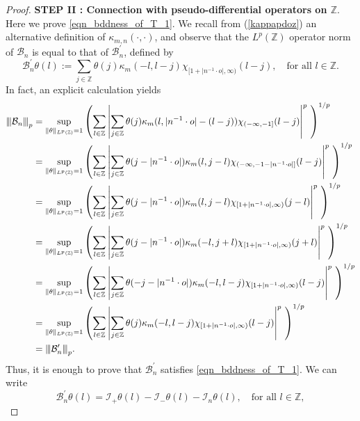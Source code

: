 \documentclass[12pt,reqno]{amsart}
\newcommand{\vertiii}[1]{{\left\vert\kern-0.25ex\left\vert\kern-0.25ex\left\vert #1 
		\right\vert\kern-0.25ex\right\vert\kern-0.25ex\right\vert}}
\newcommand{\Z}{\mathbb Z}%
\theoremstyle{definition}
\theoremstyle{definition}
\numberwithin{equation}{section}
\begin{document}
\begin{proof}
	 
\noindent \textbf{STEP II : Connection with pseudo-differential operators on $ \Z. $} Here we  prove \eqref{eqn_bddness_of_T_1}. We recall from (\ref{kappapdoz}) an alternative definition  of $\kappa_{m,n}(\cdot,\cdot)$, and observe that the $L^p(\Z)$ operator norm of $\mathcal{B}_n$ is equal to that of $\mathcal{B}^{\prime}_n$, defined by
	$$\mathcal{B}^{\prime}_n\theta(l):=\sum\limits_{j\in\mathbb{Z}}\theta(j)\kappa_{m}(-l,l-j)\chi_{[1+|n^{-1}\cdot o|,\infty)}(l-j),\quad\text{for all }l\in\mathbb{Z}.$$
In fact, an explicit calculation yields
\begin{align*}\allowdisplaybreaks
		\vertiii{\mathcal{B}_n}_{p}&=\sup\limits_{\|\theta\|_{L^{p}(\mathbb{Z})}=1}\left(\sum\limits_{l\in\mathbb{Z}}\left|\sum\limits_{j\in\mathbb{Z}}\theta(j)\kappa_{m}(l,|n^{-1}\cdot o|-(l-j))\chi_{(-\infty,-1]}(l-j)\right|^{p}~\right)^{1/p}\\
		&=\sup\limits_{\|\theta\|_{L^{p}(\mathbb{Z})}=1}\left(\sum\limits_{l\in\mathbb{Z}}\left|\sum\limits_{j\in\mathbb{Z}}\theta(j-|n^{-1}\cdot o|)\kappa_{m}(l,j-l)\chi_{(-\infty,-1-|n^{-1}\cdot o|]}(l-j)\right|^{p}~\right)^{1/p}\\
		&=\sup\limits_{\|\theta\|_{L^{p}(\mathbb{Z})}=1}\left(\sum\limits_{l\in\mathbb{Z}}\left|\sum\limits_{j\in\mathbb{Z}}\theta(j-|n^{-1}\cdot o|)\kappa_{m}(l,j-l)\chi_{[1+|n^{-1}\cdot o|,\infty)}(j-l)\right|^{p}~\right)^{1/p}\\
		&=\sup\limits_{\|\theta\|_{L^{p}(\mathbb{Z})}=1}\left(\sum\limits_{l\in\mathbb{Z}}\left|\sum\limits_{j\in\mathbb{Z}}\theta(j-|n^{-1}\cdot o|)\kappa_{m}(-l,j+l)\chi_{[1+|n^{-1}\cdot o|,\infty)}(j+l)\right|^{p}~\right)^{1/p}\\
		&=\sup\limits_{\|\theta\|_{L^{p}(\mathbb{Z})}=1}\left(\sum\limits_{l\in\mathbb{Z}}\left|\sum\limits_{j\in\mathbb{Z}}\theta(-j-|n^{-1}\cdot o|)\kappa_{m}(-l,l-j)\chi_{[1+|n^{-1}\cdot o|,\infty)}(l-j)\right|^{p}~\right)^{1/p}\\
&=\sup\limits_{\|\theta\|_{L^{p}(\mathbb{Z})}=1}\left(\sum\limits_{l\in\mathbb{Z}}\left|\sum\limits_{j\in\mathbb{Z}}\theta(j)\kappa_{m}(-l,l-j)\chi_{[1+|n^{-1}\cdot o|,\infty)}(l-j)\right|^{p}~\right)^{1/p}\\
&=\vertiii{\mathcal{B}^{\prime}_n}_{p}.
	\end{align*}
Thus, it is enough to  prove that $\mathcal{B}^{\prime}_n$ satisfies \eqref{eqn_bddness_of_T_1}. We can write 
\begin{equation}\label{eqn_decompo_ofA_n_as_I}
		 \mathcal{B}^{\prime}_n\theta (l) = \mathcal{I}_+\theta(l)-\mathcal{I}_- \theta(l)-\mathcal{I}_n\theta(l), \quad \text{for all } l \in \Z,

\end{equation}
\end{proof}
\end{document}
